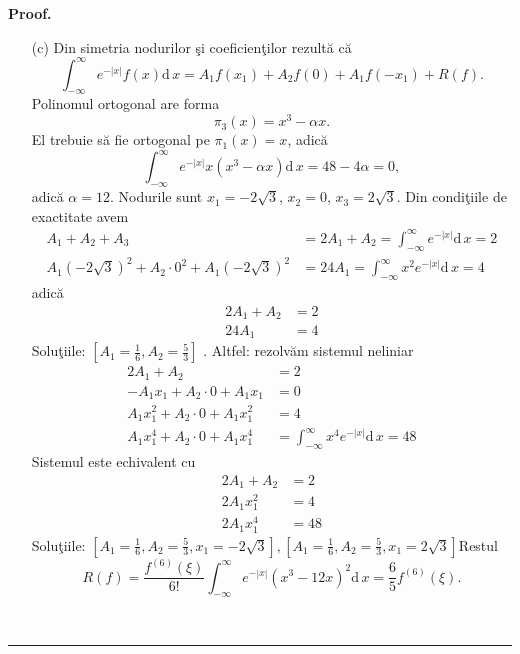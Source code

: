 \documentclass{article}%
\newenvironment{proof}[1][Proof]{\noindent\textbf{#1.} }{\ \rule{0.5em}{0.5em}}
\begin{document}
\begin{proof}
\begin{enumerate}
\item[(c)] Din simetria nodurilor \c{s}i coeficien\c{t}ilor rezult\u{a} c\u{a}%
\[
\int_{-\infty}^{\infty}e^{-|x|}f(x)\mathrm{d}\,x=A_{1}f(x_{1})+A_{2}%
f(0)+A_{1}f(-x_{1})+R(f).
\]
Polinomul ortogonal are forma
\[
\pi_{3}(x)=x^{3}-\alpha x.
\]
El trebuie s\u{a} fie ortogonal pe $\pi_{1}(x)=x$, adic\u{a}%
\[
\int_{-\infty}^{\infty}e^{-\left\vert x\right\vert }x\left(  x^{3}-\alpha
x\right)  \mathrm{d}\,x=48-4\alpha=0,
\]
adic\u{a} $\alpha=12$. Nodurile sunt $x_{1}=-2\sqrt{3}$, $x_{2}=0$,
$x_{3}=2\sqrt{3}$. Din condi\c{t}iile de exactitate avem%
\begin{align*}
A_{1}+A_{2}+A_{3} &  =2A_{1}+A_{2}=\int_{-\infty}^{\infty}e^{-\left\vert
x\right\vert }\mathrm{d}\,x=2\\
A_{1}(-2\sqrt{3})^{2}+A_{2}\cdot0^{2}+A_{1}(-2\sqrt{3})^{2} &  =24A_{1}%
=\int_{-\infty}^{\infty}x^{2}e^{-\left\vert x\right\vert }\mathrm{d}\,x=4
\end{align*}
adic\u{a}%
\begin{align*}
2A_{1}+A_{2} &  =2\\
24A_{1} &  =4
\end{align*}
Solu\c{t}iile: $\left[  A_{1}=\frac{1}{6},A_{2}=\frac{5}{3}\right]  $ .
Altfel: rezolv\u{a}m sistemul neliniar%
\begin{align*}
2A_{1}+A_{2} &  =2\\
-A_{1}x_{1}+A_{2}\cdot0+A_{1}x_{1} &  =0\\
A_{1}x_{1}^{2}+A_{2}\cdot0+A_{1}x_{1}^{2} &  =4\\
A_{1}x_{1}^{4}+A_{2}\cdot0+A_{1}x_{1}^{4} &  =\int_{-\infty}^{\infty}%
x^{4}e^{-\left\vert x\right\vert }\mathrm{d}\,x=48
\end{align*}
Sistemul este echivalent cu%
\begin{align*}
2A_{1}+A_{2} &  =2\\
2A_{1}x_{1}^{2} &  =4\\
2A_{1}x_{1}^{4} &  =48
\end{align*}
Solu\c{t}iile: $\left[  A_{1}=\frac{1}{6},A_{2}=\frac{5}{3},x_{1}=-2\sqrt
{3}\right]  ,\left[  A_{1}=\frac{1}{6},A_{2}=\frac{5}{3},x_{1}=2\sqrt
{3}\right]  \allowbreak$\newline Restul%
\[
R(f)=\frac{f^{(6)}(\xi)}{6!}\int_{-\infty}^{\infty}e^{-\left\vert x\right\vert
}\left(  x^{3}-12x\right)  ^{2}\mathrm{d}\,x=\frac{6}{5}f^{(6)}(\xi).
\]
\newline
\end{enumerate}
\end{proof}
\end{document}
